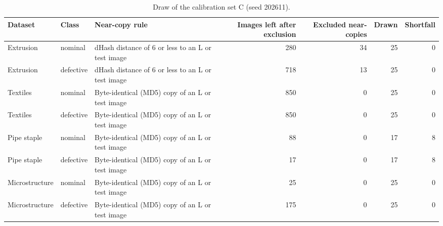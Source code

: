 \begin{table}

\caption{\label{tab:tbl-draw}Draw of the calibration set C (seed 202611).}
\centering
\begin{tabular}[t]{lllrrrr}
\toprule
Dataset & Class & Near-copy rule & Images left after exclusion & Excluded near-copies & Drawn & Shortfall\\
\midrule
Extrusion & nominal & dHash distance of 6 or less to an L or test image & 280 & 34 & 25 & 0\\
Extrusion & defective & dHash distance of 6 or less to an L or test image & 718 & 13 & 25 & 0\\
Textiles & nominal & Byte-identical (MD5) copy of an L or test image & 850 & 0 & 25 & 0\\
Textiles & defective & Byte-identical (MD5) copy of an L or test image & 850 & 0 & 25 & 0\\
Pipe staple & nominal & Byte-identical (MD5) copy of an L or test image & 88 & 0 & 17 & 8\\
\addlinespace
Pipe staple & defective & Byte-identical (MD5) copy of an L or test image & 17 & 0 & 17 & 8\\
Microstructure & nominal & Byte-identical (MD5) copy of an L or test image & 25 & 0 & 25 & 0\\
Microstructure & defective & Byte-identical (MD5) copy of an L or test image & 175 & 0 & 25 & 0\\
\bottomrule
\end{tabular}
\end{table}
